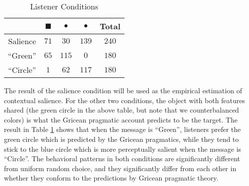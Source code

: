 \begin{table}[htb] 
  \caption{Listener Conditions}
  \centering
\begin{tabular}{c|cccc}
   & \quad \textcolor{green!65}{\Large{$\blacksquare$}}&  \textcolor{green!65}{\Huge{$\bullet$}}& \textcolor{blue!65}{\Huge{$\bullet$}} & Total\\ 
     \hline
 Salience   \quad  & \quad  $71$      \quad    &   $30$    \quad     & $139$ \quad     & $240$      \\
 ``Green''   \quad  & \quad  $65$      \quad    &   $115$    \quad     & $0$ \quad     & $180$     \\
 ``Circle''   &  \quad $1$        &    $62$        & $117$ \quad     & $180$
  \end{tabular}

  \label{table:listener}
\end{table}

The result of the salience condition will be used as the empirical
estimation of contextual salience. For the other two conditions, the
object with both features shared (the green circle in the above table,
but note that we counterbalanced colors) is what the Gricean pragmatic
account predicts to be the target. The result in Table
\ref{table:listener} shows that when the message is ``Green'',
listeners prefer the green circle which is predicted by the Gricean
pragmatics, while they tend to stick to the blue circle which is more
perceptually salient when the message is ``Circle''. The behavioral
patterns in both conditions are significantly different from uniform
random choice, and they significantly differ from each other in
whether they conform to the predictions by Gricean pragmatic theory.

